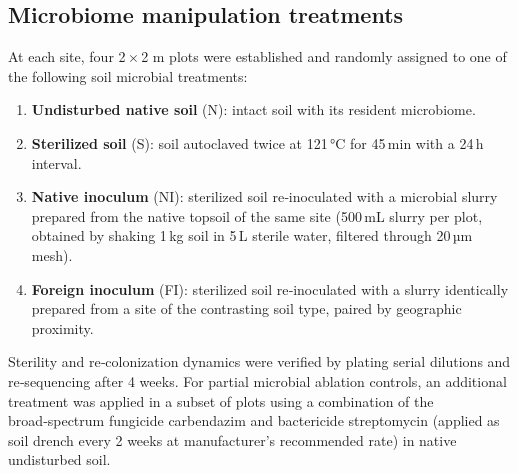 \documentclass{article}
\begin{document}
\begin{itemize}
\subsection{Microbiome manipulation treatments}
At each site, four 2\,\(\times\)\,2 m plots were established and randomly assigned to one of the following soil microbial treatments:
\begin{enumerate}
    \item \textbf{Undisturbed native soil} (N): intact soil with its resident microbiome.
    \item \textbf{Sterilized soil} (S): soil autoclaved twice at 121\,°C for 45\,min with a 24\,h interval.
    \item \textbf{Native inoculum} (NI): sterilized soil re‑inoculated with a microbial slurry prepared from the native topsoil of the same site (500\,mL slurry per plot, obtained by shaking 1\,kg soil in 5\,L sterile water, filtered through 20\,µm mesh).
    \item \textbf{Foreign inoculum} (FI): sterilized soil re‑inoculated with a slurry identically prepared from a site of the contrasting soil type, paired by geographic proximity.
\end{enumerate}
Sterility and re‑colonization dynamics were verified by plating serial dilutions and re‑sequencing after 4 weeks. For partial microbial ablation controls, an additional treatment was applied in a subset of plots using a combination of the broad‑spectrum fungicide carbendazim and bactericide streptomycin (applied as soil drench every 2 weeks at manufacturer’s recommended rate) in native undisturbed soil.


\end{itemize}
\end{document}
